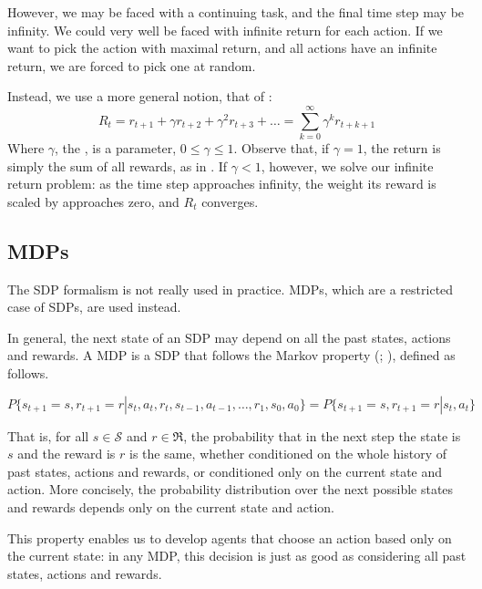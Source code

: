 However, we may be faced with a continuing task, and the final time step may be
infinity. We could very well be faced with infinite return for each action.
If we want to pick the action with maximal return, and all actions have an
infinite return, we are forced to pick one at random.

Instead, we use a more general notion, that of :
\begin{equation}
  R_t = r_{t+1} + \gamma r_{t+2} + \gamma^2 r_{t+3} + \dots = \sum_{k=0}^\infty
\gamma^k r_{t+k+1}
\end{equation}
Where $\gamma$, the , is a parameter, $0 \leq \gamma \leq
1$. Observe that, if $\gamma=1$, the return is simply the sum of all rewards, as
in . If $\gamma<1$, however, we solve our
infinite return problem: as the time step approaches infinity, the weight its
reward is scaled by approaches zero, and $R_t$ converges.
\citep[Subsection~17.1.1]{russell2009aima}

\subsection{\aclp{MDP}\label{subsec:MDP}}
The \ac{SDP} formalism is not really used in practice. \acfp{MDP}, which are a
restricted case of \acp{SDP}, are used instead.

In general, the next state of an \ac{SDP} may depend on all the past states,
actions and rewards. A \acl{MDP} is a \acl{SDP} that follows the Markov property
(\cite[Section~3.5]{sutton1998introduction};
\cite[Section~17.1]{russell2009aima}), defined as follows.

\begin{equation}
  P \lbrace s_{t+1} = s, r_{t+1} = r | s_t,a_t,r_t,s_{t-1},a_{t-1}, \dots, r_1, s_0, a_0 \rbrace =
  P \lbrace s_{t+1} = s, r_{t+1} = r | s_t,a_t \rbrace
\end{equation}

That is, for all $s\in\mathcal{S}$ and $r\in\mathfrak{R}$, the probability that
in the next step the state is $s$ and the reward is $r$ is the same, whether
conditioned on the whole history of past states, actions and rewards, or
conditioned only on the current state and action. More concisely, the
probability distribution over the next possible states and rewards depends only
on the current state and action.

This property enables us to develop agents that choose an action
based only on the current state: in any \ac{MDP}, this decision is just as good as
considering all past states, actions and rewards.

